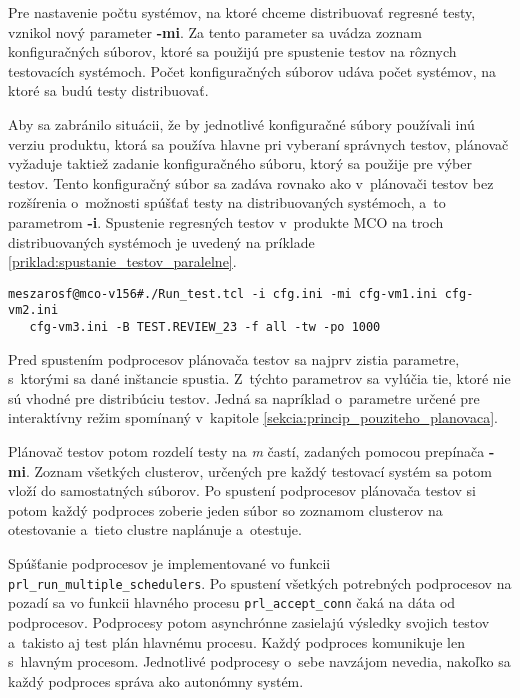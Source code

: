Pre nastavenie počtu systémov, na ktoré chceme distribuovať  
regresné testy, vznikol nový parameter \textbf{-mi}.
Za tento parameter sa uvádza zoznam konfiguračných súborov, ktoré sa 
použijú pre spustenie testov na rôznych testovacích systémoch. 
Počet konfiguračných súborov udáva počet systémov, na ktoré sa budú 
testy distribuovať.

Aby sa zabránilo situácii, že by jednotlivé konfiguračné súbory používali 
inú verziu produktu, ktorá sa používa hlavne pri vyberaní správnych testov, 
plánovač vyžaduje taktiež zadanie konfiguračného súboru, ktorý
sa použije pre výber testov. 
Tento konfiguračný súbor sa zadáva rovnako ako v~plánovači testov 
bez rozšírenia o~možnosti spúšťať testy na distribuovaných systémoch, 
a~to parametrom \textbf{-i}.
Spustenie regresných testov v~produkte MCO na troch distribuovaných 
systémoch je uvedený na príklade
\ref{priklad:spustanie_testov_paralelne}.

\begin{lstlisting}[caption=Príkaz pre distribúciu regresných testov v 
produkte MCO na 3 testovacie systémy,
label=priklad:spustanie_testov_paralelne]
meszarosf@mco-v156#./Run_test.tcl -i cfg.ini -mi cfg-vm1.ini cfg-vm2.ini 
   cfg-vm3.ini -B TEST.REVIEW_23 -f all -tw -po 1000
\end{lstlisting}

Pred spustením podprocesov plánovača testov sa najprv zistia parametre, 
s~ktorými sa dané  inštancie spustia. 
Z~týchto parametrov sa vylúčia tie, ktoré nie sú vhodné pre
distribúciu testov. Jedná sa napríklad o~parametre určené pre 
interaktívny režim spomínaný v~kapitole 
\ref{sekcia:princip_pouziteho_planovaca}.

Plánovač testov potom rozdelí testy na \textit{m} častí, zadaných pomocou 
prepínača \textbf{-mi}. Zoznam všetkých clusterov, určených pre každý 
testovací systém sa potom vloží do samostatných súborov.
Po spustení podprocesov plánovača testov si potom každý podproces zoberie 
jeden súbor so zoznamom clusterov na otestovanie a~tieto clustre 
naplánuje a~otestuje.

Spúšťanie podprocesov je implementované vo funkcii 
\texttt{prl\_run\_multiple\_schedulers}.
Po spustení všetkých potrebných podprocesov na pozadí sa vo funkcii 
hlavného procesu \texttt{prl\_accept\_conn} čaká na dáta od podprocesov.
Podprocesy potom asynchrónne zasielajú výsledky svojich testov 
a~takisto aj test plán hlavnému procesu. 
Každý podproces komunikuje len s~hlavným procesom. 
Jednotlivé podprocesy o~sebe navzájom nevedia, nakoľko sa každý podproces 
správa ako autonómny systém. 

